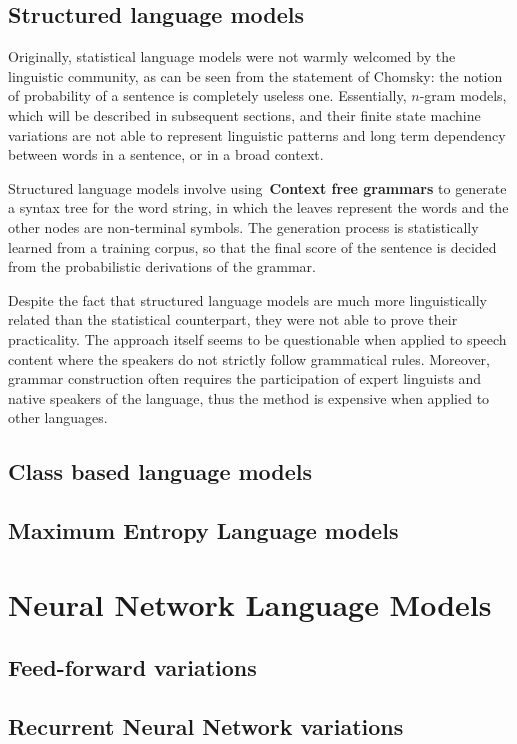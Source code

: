 \subsection{Structured language models}
Originally, statistical language models were not warmly welcomed by the linguistic community, as can be seen from the 
statement of Chomsky: the notion of probability of a sentence is completely useless one. Essentially, $n$-gram models, which will be described in subsequent sections, 
and their finite state machine variations are not able to represent linguistic patterns and long term dependency between words in a sentence, or in a broad context. 

Structured language models involve using~\textbf{Context free grammars} to generate a syntax tree for the word string, in which the leaves represent the words and the 
other nodes are non-terminal symbols. The generation process is statistically learned from a training corpus, so that the final score of the sentence is decided from the probabilistic
derivations of the grammar. 

Despite the fact that structured language models are much more linguistically related than the statistical counterpart, they were not able to prove their practicality. The approach itself seems to be questionable when applied to speech content where the speakers do not strictly follow grammatical rules. Moreover, grammar construction often requires the participation of expert linguists and native speakers of the language, thus the method is expensive when applied to other languages. 



\subsection{Class based language models}

\subsection{Maximum Entropy Language models}

\section{Neural Network Language Models}

\subsection{Feed-forward variations}

\subsection{Recurrent Neural Network variations}
